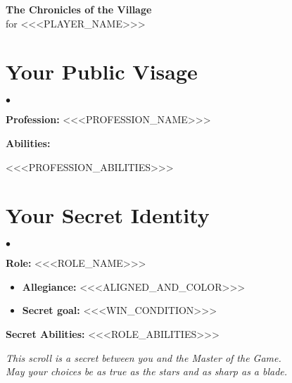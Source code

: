 \documentclass[12pt, a4paper]{article}
\newcommand{\sectiondivider}{%
  \par\noindent\hrulefill\quad\textbf{$\bullet$}\quad\hrulefill\par
}
\begin{document}
\pagestyle{empty}

\begin{center}
    {\Huge\textbf{The Chronicles of the Village}}\\
    {\large for <<<PLAYER_NAME>>>}
    \vspace{1cm}
\end{center}

\begin{tcolorbox}[characterbox, title={Character}]
    \vspace{-4mm}
    \section*{\centering Your Public Visage}
    \sectiondivider
    \vspace{2mm}

    \textbf{Profession:} <<<PROFESSION_NAME>>>
    \vspace{2mm}

    \textbf{Abilities:}

    <<<PROFESSION_ABILITIES>>>

    \vspace{6mm}
    \section*{\centering Your Secret Identity}
    \sectiondivider
    \vspace{2mm}

    \textbf{Role:} <<<ROLE_NAME>>>
    \begin{itemize}[leftmargin=*, label=--, itemsep=2pt]
        \item \textbf{Allegiance:} <<<ALIGNED_AND_COLOR>>>
        \item \textbf{Secret goal:} <<<WIN_CONDITION>>>
    \end{itemize}
    \vspace{2mm}

    \textbf{Secret Abilities:}
    <<<ROLE_ABILITIES>>>

\end{tcolorbox}

\vspace{1cm}
\begin{center}
    \textit{This scroll is a secret between you and the Master of the Game.} \\
    \textit{May your choices be as true as the stars and as sharp as a blade.}
\end{center}
\end{document}

